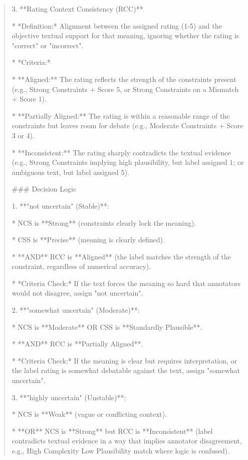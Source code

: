 \begin{quote}
3.  **Rating Context Consistency (RCC)**

    *   *Definition:* Alignment between the assigned rating (1-5) and the objective textual support for that meaning, ignoring whether the rating is "correct" or "incorrect".

    *   *Criteria:*

        *   **Aligned:** The rating reflects the strength of the constraints present (e.g., Strong Constraints + Score 5, or Strong Constraints on a Mismatch + Score 1).

        *   **Partially Aligned:** The rating is within a reasonable range of the constraints but leaves room for debate (e.g., Moderate Constraints + Score 3 or 4).

        *   **Inconsistent:** The rating sharply contradicts the textual evidence (e.g., Strong Constraints implying high plausibility, but label assigned 1; or ambiguous text, but label assigned 5).



### Decision Logic



1.  **"not uncertain" (Stable)**:

    *   NCS is **Strong** (constraints clearly lock the meaning).

    *   CSS is **Precise** (meaning is clearly defined).

    *   **AND** RCC is **Aligned** (the label matches the strength of the constraint, regardless of numerical accuracy).

    *   *Criteria Check:* If the text forces the meaning so hard that annotators would not disagree, assign "not uncertain".



2.  **"somewhat uncertain" (Moderate)**:

    *   NCS is **Moderate** OR CSS is **Standardly Plausible**.

    *   **AND** RCC is **Partially Aligned**.

    *   *Criteria Check:* If the meaning is clear but requires interpretation, or the label rating is somewhat debatable against the text, assign "somewhat uncertain".



3.  **"highly uncertain" (Unstable)**:

    *   NCS is **Weak** (vague or conflicting context).

    *   **OR** NCS is **Strong** but RCC is **Inconsistent** (label contradicts textual evidence in a way that implies annotator disagreement, e.g., High Complexity Low Plausibility match where logic is confused).


\end{quote}

